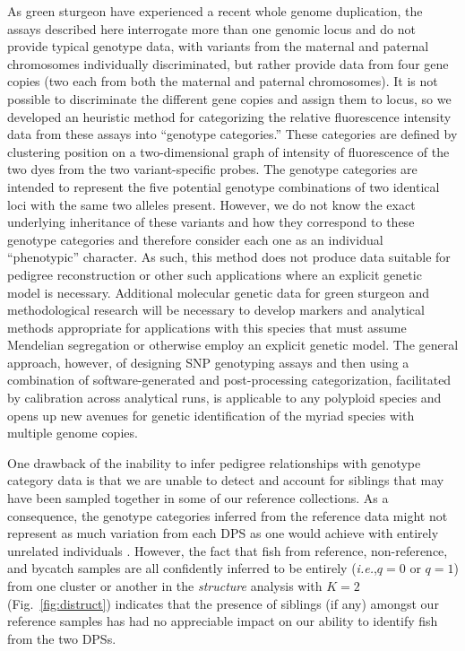 \documentclass[twocolumn,natbib]{svjour3}       %
\newcommand{\ie}{{\em i.e.},\xspace }
\begin{document}
As green sturgeon have experienced a recent whole genome duplication, the assays described here 
interrogate more than one genomic locus and do not provide typical genotype data, 
with variants from the maternal and paternal chromosomes individually discriminated, 
but rather provide data from four gene copies (two each from both the maternal and 
paternal chromosomes). It is not possible to discriminate the different gene copies 
and assign them to locus, so we developed an heuristic method for categorizing the 
relative fluorescence intensity data from these assays into ``genotype categories.'' 
These categories are defined by clustering position on a two-dimensional graph of 
intensity of fluorescence of the two dyes from the two 
variant-specific probes. The genotype categories are intended to represent the 
five potential genotype combinations of two identical loci with the same two alleles 
present. However, we do not know the exact underlying inheritance of these variants 
and how they correspond to these genotype categories and therefore consider each 
one as an individual ``phenotypic'' character. As such, this method does not produce 
data suitable for pedigree reconstruction or other such applications where an explicit 
genetic model is necessary. Additional molecular genetic data for green sturgeon and 
methodological research will be necessary to develop markers and analytical methods 
appropriate for applications with this species that must assume Mendelian segregation 
or otherwise employ an explicit genetic model. The general approach, however, of designing 
SNP genotyping assays and then using a combination of software-generated and 
post-processing categorization, facilitated by calibration across analytical runs, 
is applicable to any polyploid species and opens up new avenues for genetic 
identification of the myriad species with multiple genome copies.

One drawback of the inability to infer pedigree relationships with genotype
category data is that we are unable to detect and account for siblings that may have
been sampled together in some of our reference collections.
As a consequence, 
the genotype categories inferred from the reference data might not represent as much
variation from each DPS as one would achieve with entirely unrelated individuals \citep{waples2017purging}.  However,
the fact that fish from reference, non-reference, and bycatch samples are all confidently
inferred to be entirely (\ie $q=0$ or $q=1$) from one cluster or another
in the {\em structure} analysis with $K=2$ (Fig.~\ref{fig:distruct}) indicates that the 
presence of siblings (if any) amongst our reference samples has
had no appreciable impact
on our ability to identify fish from the two DPSs. 
\end{document}
